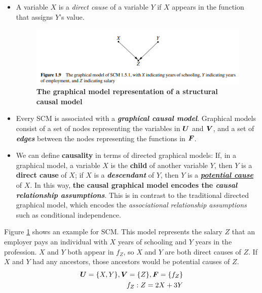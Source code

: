\documentclass[11pt]{article}
\begin{document}
\begin{itemize}
\item A variable $X$ is a \emph{direct cause} of a variable $Y$ if $X$ appears in the function that assigns $Y$'s value. 
\begin{figure}
\begin{minipage}[t]{1\linewidth}
  \centering
  \centerline{\includegraphics[scale = 0.5]{scm_graph.png}}
\end{minipage}
\caption{\footnotesize{\textbf{The graphical model representation of a structural causal model  \citep{pearl2009causal}}}}
\label{fig: scm_graph}
\end{figure}

\item Every SCM is associated with a \textbf{\emph{graphical causal model}}. Graphical models consist of a set of nodes representing the variables in $\boldsymbol{U}$ and $\boldsymbol{V}$, and a set of \emph{\textbf{edges}} between the nodes representing the functions in $\boldsymbol{F}$. 

\item We can define \textbf{causality} in terms of directed graphical models: If, in a graphical model, a variable $X$ is the \textbf{child} of another variable $Y$, then $Y$ is a \textbf{direct cause} of $X$; if $X$ is a \emph{\textbf{descendant}} of $Y$, then $Y$ is a \underline{\emph{\textbf{potential cause}}} of $X$. In this way, \textbf{the causal graphical model encodes the \emph{causal relationship assumptions}}. This is in contrast to the traditional directed graphical model, which encodes the \emph{associational relationship assumptions} such as conditional independence.
\end{itemize}

Figure \ref{fig: scm_graph} shows an example for SCM. This model represents the salary $Z$ that an employer pays an individual with $X$ years of
schooling and $Y$ years in the profession. $X$ and $Y$ both appear in $f_{Z}$, so $X$ and $Y$ are both direct causes of $Z$. If $X$ and $Y$ had any ancestors, those ancestors would be potential causes of $Z$.
\begin{align*}
\boldsymbol{U} = \{X, Y\}, \boldsymbol{V} = \{Z\},  \boldsymbol{F} = \{f_Z\} \\
f_Z: Z = 2X + 3Y
\end{align*}
\end{document}

